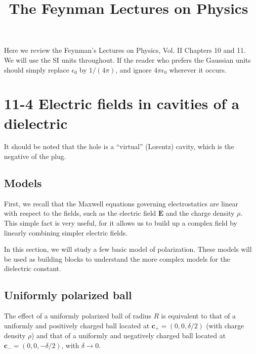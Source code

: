 \documentclass[11pt]{article}
\newcommand{\vct}[1]{\boldsymbol{\mathbf{#1}}}
\newcommand{\vE}{\vct{E}}
\begin{document}
\title{The Feynman Lectures on Physics}
\author{ \vspace{-10ex} }
\date{ \vspace{-10ex} }
\maketitle



Here we review the Feynman's Lectures on Physics,
Vol. II Chapters 10 and 11.
%
We will use the SI units throughout.
If the reader who prefers the Gaussian units
should simply replace $\epsilon_0$ by $1/(4 \pi)$,
and ignore $4\pi \epsilon_0$ wherever it occurs.


\section{11-4 Electric fields in cavities of a dielectric}



It should be noted that the hole is
a ``virtual'' (Lorentz) cavity,
which is the negative of the plug.



\subsection{Models}



First, we recall that the Maxwell equations governing electrostatics
are linear with respect to the fields,
such as the electric field $\vE$ and the charge density $\rho$.
%
This simple fact is very useful,
for it allows us to build up a complex field
by linearly combining simpler electric fields.

In this section,
we will study a few basic model of polarization.
%
These models will be used as building blocks
to understand the more complex models
for the dielectric constant.



\subsection{Uniformly polarized ball}



The effect of a uniformly polarized ball of radius $R$ is equivalent to
that of a uniformly and positively charged ball
located at $\vct c_+ = (0, 0, \delta/2)$ (with charge density $\rho$)
and that of a uniformly and negatively charged ball
located at $\vct c_- = (0, 0, -\delta/2)$,
with $\delta \rightarrow 0$.
\end{document}
